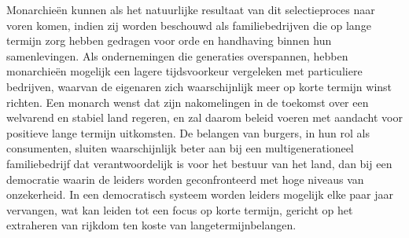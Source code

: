 Monarchieën kunnen als het natuurlijke resultaat van dit selectieproces naar voren komen, indien zij worden beschouwd als familiebedrijven die op lange termijn zorg hebben gedragen voor orde en handhaving binnen hun samenlevingen. Als ondernemingen die generaties overspannen, hebben monarchieën mogelijk een lagere tijdsvoorkeur vergeleken met particuliere bedrijven, waarvan de eigenaren zich waarschijnlijk meer op korte termijn winst richten. Een monarch wenst dat zijn nakomelingen in de toekomst over een welvarend en stabiel land regeren, en zal daarom beleid voeren met aandacht voor positieve lange termijn uitkomsten. De belangen van burgers, in hun rol als consumenten, sluiten waarschijnlijk beter aan bij een multigenerationeel familiebedrijf dat verantwoordelijk is voor het bestuur van het land, dan bij een democratie waarin de leiders worden geconfronteerd met hoge niveaus van onzekerheid. In een democratisch systeem worden leiders mogelijk elke paar jaar vervangen, wat kan leiden tot een focus op korte termijn, gericht op het extraheren van rijkdom ten koste van langetermijnbelangen.\autocite{212}
